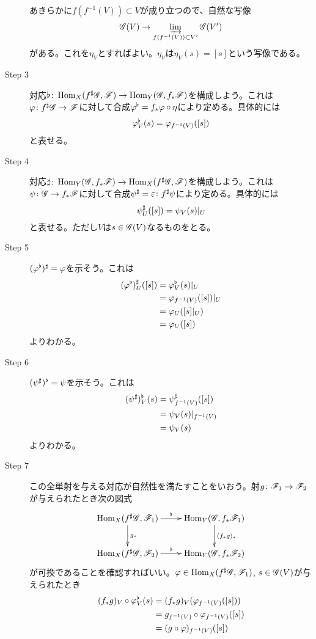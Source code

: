 \begin{description}
  あきらかに$f(f^{-1}(V)) \subset V$が成り立つので、自然な写像
  \[
  \mathscr{G}(V) \to \operatorname*{\varinjlim}_{f(f^{-1}(V)) \subset V' } \mathscr{G}(V')
  \]
  がある。これを$\eta_V$とすればよい。$\eta_V$は$\eta_V(s) = [s] $という写像である。
  \item[Step 3] 対応$\flat \colon \operatorname{Hom}_X(f^{\sharp}\mathscr{G} , \mathscr{F}) \to \operatorname{Hom}_Y(\mathscr{G} , f_*\mathscr{F})$を構成しよう。これは${\varphi} \colon f^{\sharp}\mathscr{G} \to \mathscr{F}$に対して合成${\varphi}^{\flat} = f_* {\varphi} \circ \eta$により定める。具体的には
  \[
  {\varphi}^{\flat}_V (s) = {\varphi}_{f^{-1}(V)} ([s])
  \]
  と表せる。
  \item[Step 4] 対応$\sharp \colon \operatorname{Hom}_Y(\mathscr{G} , f_*\mathscr{F}) \to \operatorname{Hom}_X(f^{\sharp}\mathscr{G} , \mathscr{F})$を構成しよう。これは$\psi \colon \mathscr{G} \to f_* \mathscr{F}$に対して合成$\psi^{\sharp} = {\varepsilon} \colon f^{\sharp} \psi$により定める。具体的には
  \[
  \psi^{\sharp}_U([s]) = \psi_V(s) |_U
  \]
  と表せる。ただし$V$は$s \in \mathscr{G}(V)$なるものをとる。
  \item[Step 5] $({\varphi}^{\flat})^{\sharp} = {\varphi}$を示そう。これは
  \begin{align*}
    ({\varphi}^{\flat})^{\sharp}_U([s]) &= {\varphi}^{\flat}_V (s) |_U \\
    &= {\varphi}_{f^{-1}(V)} ([s]) |_U \\
    &= {\varphi}_U ( [s] |_U  ) \\
    &= {\varphi}_U([s])
  \end{align*}
  よりわかる。
  \item[Step 6] $(\psi^{\sharp})^{\flat} = \psi$を示そう。これは
  \begin{align*}
    (\psi^{\sharp})^{\flat}_V(s) &= \psi^{\sharp}_{f^{-1}(V)}([s]) \\
    &= \psi_V(s)|_{f^{-1}(V)} \\
    &= \psi_V(s)
  \end{align*}
  よりわかる。
  \item[Step 7] この全単射を与える対応が自然性を満たすことをいおう。射$g \colon \mathscr{F}_1 \to \mathscr{F}_2$が与えられたとき次の図式
  \[
  \xymatrix{
  \Hom_X(f\sh\scrg, \scrf_1) \ar[r]^-{\flat} \ar[d]^-{g_*} & \Hom_Y(\scrg,f_*\scrf_1) \ar[d]^-{(f_*g)_*} \\
  \Hom_X(f\sh\scrg, \scrf_2) \ar[r]^-{\flat} & \Hom_Y(\scrg,f_*\scrf_2)
  }
  \]
  が可換であることを確認すればいい。${\varphi} \in \operatorname{Hom}_X(f^{\sharp}\mathscr{G}, \mathscr{F}_1)$, $s \in \mathscr{G}(V)$が与えられたとき
  \begin{align*}
    (f_* g)_V \circ \vp\fl_V(s) &= (f_*g)_V ( \vp_{f^{-1}(V)}([s]) ) \\
    &= g_{f^{-1}(V)} \circ \vp_{f^{-1}(V)} ([s]) \\
    &= (g \circ \vp)_{ f^{-1}(V)} ([s]) \\

\end{align*}
\end{description}
